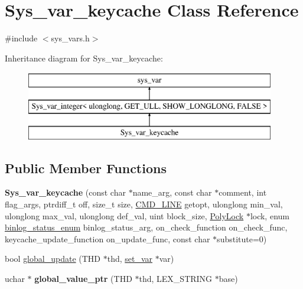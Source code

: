 \hypertarget{classSys__var__keycache}{}\section{Sys\+\_\+var\+\_\+keycache Class Reference}
\label{classSys__var__keycache}


{\ttfamily \#include $<$sys\+\_\+vars.\+h$>$}

Inheritance diagram for Sys\+\_\+var\+\_\+keycache\+:\begin{figure}[H]
\begin{center}
\leavevmode
\includegraphics[height=3.000000cm]{classSys__var__keycache}
\end{center}
\end{figure}
\subsection*{Public Member Functions}
\begin{DoxyCompactItemize}
\item 
\mbox{\label{classSys__var__keycache_a87997075d14df614423d4bfd1d1bf22c}} 
{\bfseries Sys\+\_\+var\+\_\+keycache} (const char $\ast$name\+\_\+arg, const char $\ast$comment, int flag\+\_\+args, ptrdiff\+\_\+t off, size\+\_\+t size, \mbox{\hyperlink{structCMD__LINE}{C\+M\+D\+\_\+\+L\+I\+NE}} getopt, ulonglong min\+\_\+val, ulonglong max\+\_\+val, ulonglong def\+\_\+val, uint block\+\_\+size, \mbox{\hyperlink{classPolyLock}{Poly\+Lock}} $\ast$lock, enum \mbox{\hyperlink{classsys__var_a664520ec82191888717c86085bfa83ce}{binlog\+\_\+status\+\_\+enum}} binlog\+\_\+status\+\_\+arg, on\+\_\+check\+\_\+function on\+\_\+check\+\_\+func, keycache\+\_\+update\+\_\+function on\+\_\+update\+\_\+func, const char $\ast$substitute=0)
\item 
bool \mbox{\hyperlink{classSys__var__keycache_a7775f6e9ee55bb58461d6556f053075f}{global\+\_\+update}} (T\+HD $\ast$thd, \mbox{\hyperlink{classset__var}{set\+\_\+var}} $\ast$var)
\item 
\mbox{\label{classSys__var__keycache_af7d6b247f76cfb83faeab0a9f40386d3}} 
uchar $\ast$ {\bfseries global\+\_\+value\+\_\+ptr} (T\+HD $\ast$thd, L\+E\+X\+\_\+\+S\+T\+R\+I\+NG $\ast$base)
\end{DoxyCompactItemize}
